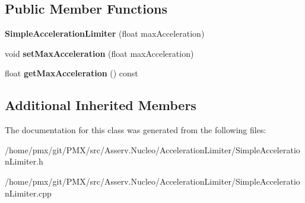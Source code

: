 \subsection*{Public Member Functions}
\begin{DoxyCompactItemize}
\item 
\mbox{\label{classSimpleAccelerationLimiter_ad13f605bb2c3471dff72422b766202a6}} 
{\bfseries Simple\+Acceleration\+Limiter} (float max\+Acceleration)
\item 
\mbox{\label{classSimpleAccelerationLimiter_aa6d0c586a520a8933573c60e499afdf5}} 
void {\bfseries set\+Max\+Acceleration} (float max\+Acceleration)
\item 
\mbox{\label{classSimpleAccelerationLimiter_adfaeb407128b8cfac8cfe7f81612f0f5}} 
float {\bfseries get\+Max\+Acceleration} () const
\end{DoxyCompactItemize}
\subsection*{Additional Inherited Members}


The documentation for this class was generated from the following files\+:\begin{DoxyCompactItemize}
\item 
/home/pmx/git/\+P\+M\+X/src/\+Asserv.\+Nucleo/\+Acceleration\+Limiter/Simple\+Acceleration\+Limiter.\+h\item 
/home/pmx/git/\+P\+M\+X/src/\+Asserv.\+Nucleo/\+Acceleration\+Limiter/Simple\+Acceleration\+Limiter.\+cpp\end{DoxyCompactItemize}

